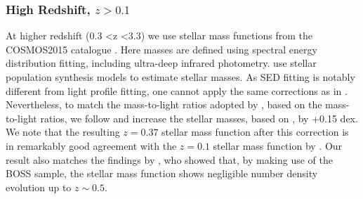 \subsubsection{High Redshift, $z > 0.1$}
\label{subsub:Davidzon}
At higher redshift (0.3 \textless z \textless 3.3) we use stellar mass functions from the COSMOS2015 catalogue \citep{Davidzon2017TheSnapshots}. Here masses are defined using spectral energy distribution fitting, including ultra-deep infrared photometry. \citet{Davidzon2017TheSnapshots} use \citet{Bruzual2003Stellar2003} stellar population synthesis models to estimate stellar masses. As SED fitting is notably different from light profile fitting, one cannot apply the same corrections as in \citet{Mendel2014ASURVEY}. 
Nevertheless, to match the mass-to-light ratios adopted by \citet{Mendel2014ASURVEY}, based on the \citet{Bell2003TheFunctions} mass-to-light ratios, we follow \citet{Bernardi2013TheProfile} and increase the \citet{Davidzon2017TheSnapshots} stellar masses, based on \citet{Bruzual2003Stellar2003}, by +0.15 dex. We note that the resulting $z=0.37$ stellar mass function after this correction is in remarkably good agreement with the $z=0.1$ stellar mass function by \citep{Bernardi2013TheProfile}. Our result also matches the findings by \citet{Bernardi2016TheEvolution}, who showed that, by making use of the BOSS sample, the stellar mass function shows negligible number density evolution up to $z \sim 0.5$.

\label{subsec:Clusters}
